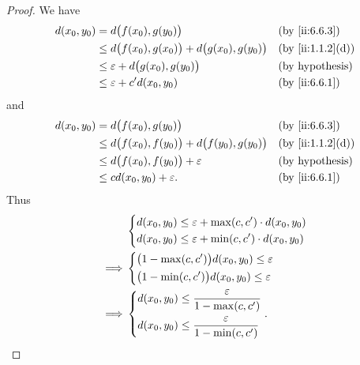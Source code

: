 \begin{proof}
  We have
  \begin{align*}
    d(x_0, y_0) & = d\big(f(x_0), g(y_0)\big)                                &  & \by{ii:6.6.3}          \\
                & \leq d\big(f(x_0), g(x_0)\big) + d\big(g(x_0), g(y_0)\big) &  & \by{ii:1.1.2}[d]       \\
                & \leq \varepsilon + d\big(g(x_0), g(y_0)\big)               &  & \text{(by hypothesis)} \\
                & \leq \varepsilon + c' d(x_0, y_0)                          &  & \by{ii:6.6.1}
  \end{align*}
  and
  \begin{align*}
    d(x_0, y_0) & = d\big(f(x_0), g(y_0)\big)                                &  & \by{ii:6.6.3}          \\
                & \leq d\big(f(x_0), f(y_0)\big) + d\big(f(y_0), g(y_0)\big) &  & \by{ii:1.1.2}[d]       \\
                & \leq d\big(f(x_0), f(y_0)\big) + \varepsilon               &  & \text{(by hypothesis)} \\
                & \leq c d(x_0, y_0) + \varepsilon.                          &  & \by{ii:6.6.1}
  \end{align*}
  Thus
  \begin{align*}
             & \begin{dcases}
                 d(x_0, y_0) \leq \varepsilon + \max(c, c') \cdot d(x_0, y_0) \\
                 d(x_0, y_0) \leq \varepsilon + \min(c, c') \cdot d(x_0, y_0)
               \end{dcases} \\
    \implies & \begin{dcases}
                 \big(1 - \max(c, c')\big) d(x_0, y_0) \leq \varepsilon \\
                 \big(1 - \min(c, c')\big) d(x_0, y_0) \leq \varepsilon
               \end{dcases}       \\
    \implies & \begin{dcases}
                 d(x_0, y_0) \leq \dfrac{\varepsilon}{1 - \max(c, c')} \\
                 d(x_0, y_0) \leq \dfrac{\varepsilon}{1 - \min(c, c')}
               \end{dcases}.
  \end{align*}
\end{proof}
